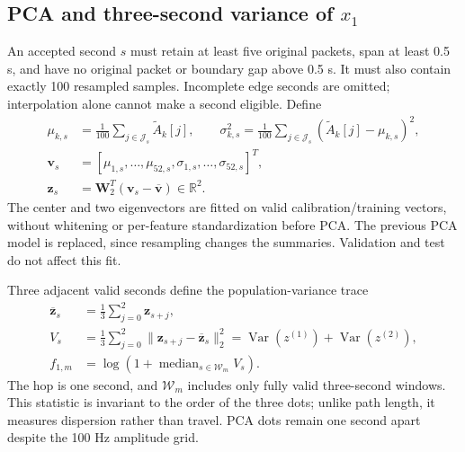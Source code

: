 \documentclass[conference,10pt,letterpaper]{IEEEtran}
\newcommand{\R}{\mathbb{R}}
\DeclareMathOperator{\med}{median}
\DeclareMathOperator{\Var}{Var}
\begin{document}
\subsection{PCA and three-second variance of $x_1$}
An accepted second $s$ must retain at least five original packets, span at least 0.5 s, and have no original packet or boundary gap above 0.5 s. It must also contain exactly 100 resampled samples. Incomplete edge seconds are omitted; interpolation alone cannot make a second eligible. Define
\begin{align}
\mu_{k,s}&=\frac{1}{100}\sum_{j\in\mathcal J_s}\widetilde A_k[j],\qquad
\sigma_{k,s}^2=\frac{1}{100}\sum_{j\in\mathcal J_s}(\widetilde A_k[j]-\mu_{k,s})^2,\\
\mathbf v_s&=[\mu_{1,s},\ldots,\mu_{52,s},\sigma_{1,s},\ldots,\sigma_{52,s}]^T,\\
\mathbf z_s&=\mathbf W_2^T(\mathbf v_s-\overline{\mathbf v})\in\R^2.\label{eq:pca}
\end{align}
The center and two eigenvectors are fitted on \FitDots{} valid calibration/training vectors, without whitening or per-feature standardization before PCA. The previous PCA model is replaced, since resampling changes the summaries. Validation and test do not affect this fit.

Three adjacent valid seconds define the population-variance trace
\begin{align}
\overline{\mathbf z}_{s}&=\tfrac13\sum_{j=0}^{2}\mathbf z_{s+j},\\
V_s&=\tfrac13\sum_{j=0}^{2}\|\mathbf z_{s+j}-\overline{\mathbf z}_{s}\|_2^2
=\Var(z^{(1)})+\Var(z^{(2)}),\\
f_{1,m}&=\log\!\left(1+\med_{s\in\mathcal W_m}V_s\right).\label{eq:csi-feature}
\end{align}
The hop is one second, and $\mathcal W_m$ includes only fully valid three-second windows. This statistic is invariant to the order of the three dots; unlike path length, it measures dispersion rather than travel. PCA dots remain one second apart despite the 100 Hz amplitude grid.
\end{document}
